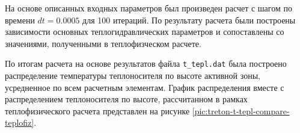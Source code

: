 
На основе описанных входных параметров был произведен расчет с шагом по времени $dt=0.0005$ для 100 итераций. По результату расчета были построены зависимости основных теплогидравлических параметров и сопоставлены со значениями, полученными в теплофизческом расчете.

По итогам расчета на основе результатов файла \texttt{t\_tepl.dat} была построено распределение температуры теплоносителя по высоте активной зоны, усредненное по всем расчетным элементам. График распределения вместе с распределением теплоносителя по высоте, рассчитанном в рамках теплофизического расчета представлен на рисунке \ref{pic:treton-t-tepl-compare-teplofiz}.

